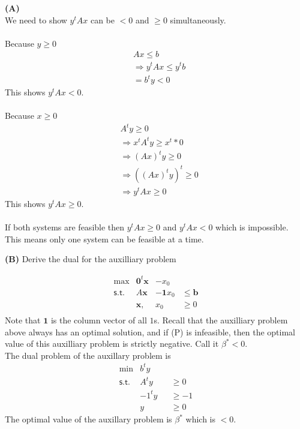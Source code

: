 \documentclass[11pt]{article}
\begin{document}
\noindent\textbf{(A)}
\\
We need to show $y^tAx$ can be $<0$ and $\geq 0$ simultaneously.\\
\\
Because $y \geq 0$
\begin{align*}
&Ax \leq b \\
&\Rightarrow y^tAx \leq y^tb \\
&= b^ty < 0
\end{align*}
This shows $y^tAx < 0$.\\
\\
Because $x \geq 0$
\begin{align*}
&A^ty \geq 0 \\
&\Rightarrow x^tA^ty \geq x^t*0\\
&\Rightarrow (Ax)^ty \geq 0 \\
&\Rightarrow ((Ax)^ty)^t \geq 0 \\
&\Rightarrow y^tAx \geq 0
\end{align*}
This shows $y^tAx \geq 0$.\\
\\ 
If both systems are feasible then $y^tAx \geq 0$ and $y^tAx < 0$ which is impossible.  This means only one system can be feasible at a time. 
\medskip

\noindent\textbf{(B)} Derive the dual for the auxilliary problem 

\[ \begin{array}{rlll}
\max & \mathbf{0}^t \mathbf{x}  &- x_0 \\
\mathsf{s.t.} & A \mathbf{x} &  - \mathbf{1} x_0 & \leq \mathbf{b} \\
& \mathbf{x},  & x_0 & \geq 0 \\
\end{array}\]
Note that $\mathbf{1}$ is the column vector of all $1$s.
Recall that the auxilliary problem above always has an optimal
solution, and if \textsf{(P)} is infeasible, then the optimal value of this
auxilliary problem is strictly negative. Call it $\beta^* < 0$.
\\
The dual problem of the auxillary problem is
\[ \begin{array}{rlll}
\min & b^ty \\
\mathsf{s.t.} 
& A^ty &  & \geq 0 \\
& -1^ty & & \geq -1 \\
& y & & \geq 0
\end{array}\]
The optimal value of the auxillary problem is $\beta^*$ which is $< 0$.
\end{document}
